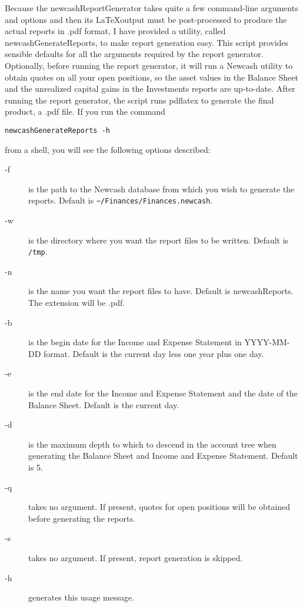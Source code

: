 \documentclass{report}
\begin{document}
Because the newcashReportGenerator takes quite a few command-line arguments and options and then its \LaTeX output must be post-processed to produce the actual reports in .pdf format, I have provided a utility, called newcashGenerateReports, to make report generation easy. This script provides sensible defaults for all the arguments required by the report generator. Optionally, before running the report generator, it will run a Newcash utility to obtain quotes on all your open positions, so the asset values in the Balance Sheet and the unrealized capital gains in the Investments reports are up-to-date. After running the report generator, the script runs pdflatex to generate the final product, a .pdf file. If you run the command
\begin{verbatim}
newcashGenerateReports -h
\end{verbatim}
from a shell, you will see the following options described:

\begin{description}
\item [-f] is the path to the Newcash database from which you wish to generate the reports. Default is \verb|~/Finances/Finances.newcash|.
\item [-w] is the directory where you want the report files to be written. Default is \verb|/tmp|.
\item [-n] is the name you want the report files to have. Default is newcashReports. The extension will be .pdf.
\item [-b] is the begin date for the Income and Expense Statement in YYYY-MM-DD format. Default is the current day less one year plus one day.
\item [-e] is the end date for the Income and Expense Statement and the date of the Balance Sheet. Default is the current day.
\item [-d] is the maximum depth to which to descend in the account tree when generating the Balance Sheet and Income and Expense Statement. Default is 5.
\item [-q] takes no argument. If present, quotes for open positions will be obtained before generating the reports.
\item [-s] takes no argument. If present, report generation is skipped.
\item [-h] generates this usage message.
\end{description}
\end{document}
